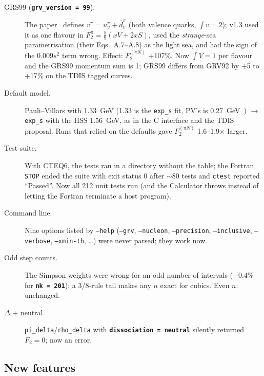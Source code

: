 \documentclass[11pt,a4paper]{article}
\newcommand{\inikey}[1]{\texttt{\textbf{#1}}}
\begin{document}
\begin{description}
\item[GRS99 (\inikey{grv\_version = 99}).] The paper~\cite{GRS99} defines
  $v^\pi=u_v^\pi+\bar d_v^\pi$ (both valence quarks, $\int v=2$); v1.3 used it
  as one flavour in $F_2^\pi=\tfrac59(xV+2xS)$, used the \emph{strange}-sea
  parametrisation (their Eqs.~A.7--A.8) as the light sea, and had the sign
  of the $0.009s^2$ term wrong.  Effect: $F_2^{(\pi N)}$ +107\%.  Now
  $\int V=1$ per flavour and the GRS99 momentum sum is 1; GRS99 differs from
  GRV92 by +5 to +17\% on the TDIS tagged curves.
\item[Default model.] Pauli--Villars with 1.33~GeV (1.33 is the
  \texttt{exp\_s} fit, PV's is 0.27~GeV~\cite{McK16}) $\to$ \texttt{exp\_s}
  with the HSS 1.56~GeV, as in the C interface and the TDIS proposal.  Runs
  that relied on the defaults gave $F_2^{(\pi N)}$ 1.6--1.9$\times$ larger.
\item[Test suite.] With CTEQ6, the tests ran in a directory without the
  table; the Fortran \texttt{STOP} ended the suite with exit status 0
  after $\sim80$ tests and \texttt{ctest} reported ``Passed''.  Now all
  212 unit tests run (and the Calculator throws instead of letting the
  Fortran terminate a host program).
\item[Command line.] Nine options listed by \texttt{--help}
  (\texttt{--grv}, \texttt{--nucleon}, \texttt{--precision},
  \texttt{--inclusive}, \texttt{--verbose}, \texttt{--xmin-th}, \dots) were
  never parsed; they work now.
\item[Odd step counts.] The Simpson weights were wrong for an odd number of
  intervals ($-0.4\%$ for \inikey{nk = 201}); a 3/8-rule tail makes any $n$
  exact for cubics.  Even $n$: unchanged.
\item[$\Delta$ + neutral.] \texttt{pi\_delta}/\texttt{rho\_delta} with
  \inikey{dissociation = neutral} silently returned $F_2=0$; now an error.
\end{description}

\subsection{New features}
\end{document}
